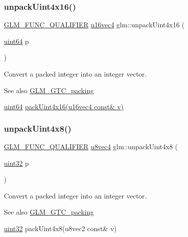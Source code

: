 \subsubsection{\texorpdfstring{unpack\+Uint4x16()}{unpackUint4x16()}}
{\footnotesize\ttfamily \hyperlink{setup_8hpp_a33fdea6f91c5f834105f7415e2a64407}{G\+L\+M\+\_\+\+F\+U\+N\+C\+\_\+\+Q\+U\+A\+L\+I\+F\+I\+ER} \hyperlink{group__gtc__type__precision_ga049d45ad8d0f78578d7ceb86a7fdaae4}{u16vec4} glm\+::unpack\+Uint4x16 (\begin{DoxyParamCaption}\item[{\hyperlink{group__gtc__type__precision_gae3632bf9b37da66233d78930dd06378a}{uint64}}]{p }\end{DoxyParamCaption})}

Convert a packed integer into an integer vector.

\begin{DoxySeeAlso}{See also}
\hyperlink{group__gtc__packing}{G\+L\+M\+\_\+\+G\+T\+C\+\_\+packing} 

\hyperlink{group__gtc__type__precision_gae3632bf9b37da66233d78930dd06378a}{uint64} \hyperlink{group__gtc__packing_ga19813cb34dd7102f9612ba6c0d9ef377}{pack\+Uint4x16(u16vec4 const\& v)} 
\end{DoxySeeAlso}
\mbox{\label{group__gtc__packing_ga99229dc6cb31d82c39a324d5753792c6}} 
\subsubsection{\texorpdfstring{unpack\+Uint4x8()}{unpackUint4x8()}}
{\footnotesize\ttfamily \hyperlink{setup_8hpp_a33fdea6f91c5f834105f7415e2a64407}{G\+L\+M\+\_\+\+F\+U\+N\+C\+\_\+\+Q\+U\+A\+L\+I\+F\+I\+ER} \hyperlink{group__gtc__type__precision_ga6c8841fa492bd5b1078b171452fd6974}{u8vec4} glm\+::unpack\+Uint4x8 (\begin{DoxyParamCaption}\item[{\hyperlink{group__gtc__type__precision_ga202b6a53c105fcb7e531f9b443518451}{uint32}}]{p }\end{DoxyParamCaption})}

Convert a packed integer into an integer vector.

\begin{DoxySeeAlso}{See also}
\hyperlink{group__gtc__packing}{G\+L\+M\+\_\+\+G\+T\+C\+\_\+packing} 

\hyperlink{group__gtc__type__precision_ga202b6a53c105fcb7e531f9b443518451}{uint32} pack\+Uint4x8(u8vec2 const\& v) 
\end{DoxySeeAlso}
\mbox{\label{group__gtc__packing_ga3e6ac9178b59f0b1b2f7599f2183eb7f}} 
